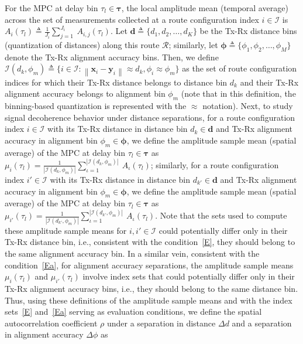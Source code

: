 \documentclass[12pt, draftcls, onecolumn]{IEEEtran}
\newcommand{\norm}[1]{\left\lVert#1\right\rVert}
\begin{document}
{For the MPC at delay bin $\tau_{l} \in \boldsymbol{\tau}$, the local amplitude mean (temporal average) across the set of measurements collected at a route configuration index $i \in \mathcal{I}$ is $A_{i}(\tau_{l}) \triangleq \frac{1}{J_{i}}\sum_{j = 1}^{J_{i}}\ A_{i,j}(\tau_{l})$. Let $\mathbf{d} \triangleq \{d_{1},d_{2},{\dots},d_{K}\}$ be the Tx-Rx distance bins (quantization of distances) along this route $\mathcal{R}$; similarly, let $\boldsymbol{\phi} \triangleq \{\phi_{1},\phi_{2},{\dots},\phi_{M}\}$ denote the Tx-Rx alignment accuracy bins. Then, we define $\mathcal{I}(d_{k}, \phi_{m}) \triangleq \{i \in \mathcal{I}: \norm{\mathbf{x}_{i} - \mathbf{y}_{i}} \approx d_{k}, \phi_{i} \approx \phi_{m}\}$ as the set of route configuration indices for which their Tx-Rx distance belongs to distance bin $d_{k}$ and their Tx-Rx alignment accuracy belongs to alignment bin $\phi_{m}$ (note that in this definition, the binning-based quantization is represented with the $\approx$ notation). Next, to study signal decoherence behavior under distance separations, for a route configuration index $i \in \mathcal{I}$ with its Tx-Rx distance in distance bin $d_{k} \in \mathbf{d}$ and Tx-Rx alignment accuracy in alignment bin $\phi_{m} \in \boldsymbol{\phi}$, we define the amplitude sample mean (spatial average) of the MPC at delay bin $\tau_{l} \in \boldsymbol{\tau}$ as $\mu_{i}(\tau_{l}) = \frac{1}{|\mathcal{I}(d_{k}, \phi_{m})|}\sum_{\iota = 1}^{|\mathcal{I}(d_{k}, \phi_{m})|}\ A_{\iota}(\tau_{l})$; similarly, for a route configuration index $i' \in \mathcal{I}$ with its Tx-Rx distance in distance bin $d_{k'} \in \mathbf{d}$ and Tx-Rx alignment accuracy in alignment bin $\phi_{m} \in \boldsymbol{\phi}$, we define the amplitude sample mean (spatial average) of the MPC at delay bin $\tau_{l} \in \boldsymbol{\tau}$ as $\mu_{i'}(\tau_{l}) = \frac{1}{|\mathcal{I}(d_{k'}, \phi_{m})|}\sum_{\iota = 1}^{|\mathcal{I}(d_{k'}, \phi_{m})|}\ A_{\iota}(\tau_{l})$. Note that the sets used to compute these amplitude sample means for $i, i' \in \mathcal{I}$ could potentially differ only in their Tx-Rx distance bin, i.e., consistent with the condition~\eqref{E}, they should belong to the same alignment accuracy bin. In a similar vein, consistent with the condition~\eqref{Ea}, for alignment accuracy separations, the amplitude sample means $\mu_{i}(\tau_{l})$ and $\mu_{i'}(\tau_{l})$ involve index sets that could potentially differ only in their Tx-Rx alignment accuracy bins, i.e., they should belong to the same distance bin. Thus, using these definitions of the amplitude sample means and with the index sets~\eqref{E} and~\eqref{Ea} serving as evaluation conditions, we define the spatial autocorrelation coefficient $\rho$ under a separation in distance $\Delta d$ and a separation in alignment accuracy $\Delta \phi$ as
}
\end{document}
